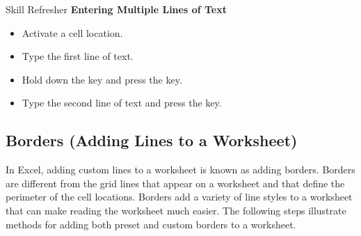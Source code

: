 \begin{center}
	\begin{sklbox}{Skill Refresher}
		\textbf{Entering Multiple Lines of Text}
		\\
		\begin{itemize}
			\setlength{\itemsep}{0pt}
			\setlength{\parskip}{0pt}
			\setlength{\parsep}{0pt}
			
			\item Activate a cell location.
			\item Type the first line of text.
			\item Hold down the  key and press the  key.
			\item Type the second line of text and press the  key.
			
		\end{itemize}
	\end{sklbox}
\end{center}

\subsection{Borders (Adding Lines to a Worksheet)}

In Excel, adding custom lines to a worksheet is known as adding borders. Borders are different from the grid lines that appear on a worksheet and that define the perimeter of the cell locations. Borders add a variety of line styles to a worksheet that can make reading the worksheet much easier. The following steps illustrate methods for adding both preset and custom borders to a worksheet.

